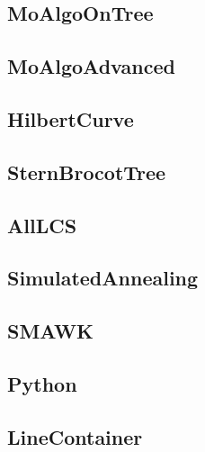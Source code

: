 	\subsection{MoAlgoOnTree}
	
	\subsection{MoAlgoAdvanced}
	
	\subsection{HilbertCurve}
	
	\subsection{SternBrocotTree}
	
	\subsection{AllLCS}
	
	\subsection{SimulatedAnnealing}
	
	\subsection{SMAWK}
	
	\subsection{Python}
	
	\subsection{LineContainer}
	
